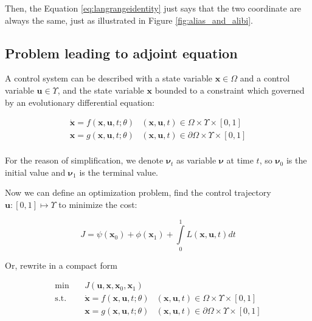\documentclass{article}
\begin{document}
Then, the Equation \ref{eq:langrangeidentity} just says that the two coordinate are always the same, just as illustrated in Figure \ref{fig:alias_and_alibi}.

\subsection{Problem leading to adjoint equation}

A control system can be described with a state variable $\mathbf{x} \in \Omega$ and a control variable $\mathbf{u} \in \Upsilon$,
and the state variable $\mathbf{x}$ bounded to a constraint which governed by an evolutionary differential equation:

\begin{equation}
\begin{array}{ll}
\dot{\mathbf{x}} = f(\mathbf{x}, \mathbf{u}, t; \theta) & (\mathbf{x}, \mathbf{u}, t) \in \Omega \times \Upsilon \times [0, 1] \\
\mathbf{x} = g(\mathbf{x}, \mathbf{u}, t; \theta) & (\mathbf{x}, \mathbf{u}, t) \in \partial \Omega \times \Upsilon \times [0, 1] \\
\end{array}
\end{equation}

For the reason of simplification, we denote $\mathbf{\nu}_t$ as variable $\mathbf{\nu}$ at time $t$,
so $\mathbf{\nu}_0$ is the initial value and $\mathbf{\nu}_1$ is the terminal value.

Now we can define an optimization problem, find the control trajectory $\mathbf{u}:[0,1] \mapsto \Upsilon$ to minimize the cost:

\begin{equation}
J = \psi(\mathbf{x}_0) + \phi(\mathbf{x}_1) + \int\limits_{0}^{1} L(\mathbf{x}, \mathbf{u}, t) dt
\end{equation}

Or, rewrite in a compact form

\begin{equation}
\begin{array}{rcll}
\min &~& J(\mathbf{u}, \mathbf{x}, \mathbf{x}_0, \mathbf{x}_1) & \\
\mathrm{s.t.} &~& \dot{\mathbf{x}} = f(\mathbf{x}, \mathbf{u}, t; \theta) & (\mathbf{x}, \mathbf{u}, t) \in \Omega \times \Upsilon \times [0, 1] \\
&~& \mathbf{x} = g(\mathbf{x}, \mathbf{u}, t; \theta) & (\mathbf{x}, \mathbf{u}, t) \in \partial \Omega \times \Upsilon \times [0, 1] \\
\end{array}
\end{equation}
\end{document}
